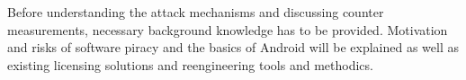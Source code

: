 Before understanding the attack mechanisms and discussing counter measurements, necessary background knowledge has to be provided. Motivation and risks of software piracy and the basics of Android will be explained as well as existing licensing solutions and reengineering tools and methodics.
